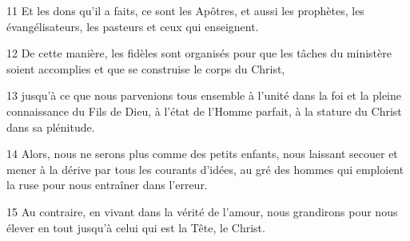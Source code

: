 
11 Et les dons qu’il a faits, ce sont les Apôtres, et aussi les prophètes, les évangélisateurs, les pasteurs et ceux qui enseignent.

12 De cette manière, les fidèles sont organisés pour que les tâches du ministère soient accomplies et que se construise le corps du Christ,

13 jusqu’à ce que nous parvenions tous ensemble à l’unité dans la foi et la pleine connaissance du Fils de Dieu, à l’état de l’Homme parfait, à la stature du Christ dans sa plénitude.

14 Alors, nous ne serons plus comme des petits enfants, nous laissant secouer et mener à la dérive par tous les courants d’idées, au gré des hommes qui emploient la ruse pour nous entraîner dans l’erreur.

15 Au contraire, en vivant dans la vérité de l’amour, nous grandirons pour nous élever en tout jusqu’à celui qui est la Tête, le Christ.